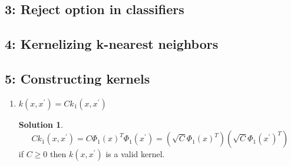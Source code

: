 \documentclass[]{book}
\theoremstyle{definition}
\newtheorem*{soln}{Solution}
\begin{document}
\subsection*{3: Reject option in classifiers  }
\subsection*{4: Kernelizing k-nearest neighbors  }
\subsection*{5: Constructing kernels  }
\begin{enumerate}
	\item $k(x,x^{'}) = C k_1(x,x^{'})$
	\begin{soln}
		$$C k_1(x,x^{'}) = C \Phi_1(x)^T \Phi_1(x^{'}) = (\sqrt{C}\Phi_1(x)^T)(\sqrt{C}\Phi_1(x^{'})^T)$$
		if $C\geq0$ then $k(x,x^{'})$ is a valid kernel.
	\end{soln}
\end{enumerate}
\end{document}
